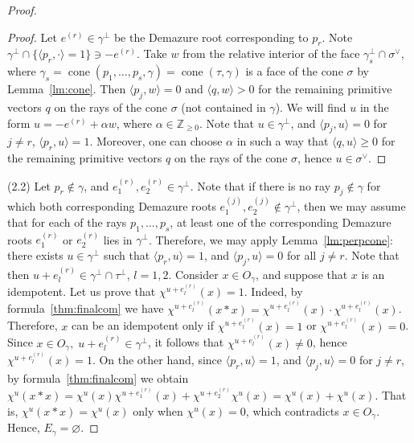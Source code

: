 \documentclass[10pt,a4paper]{amsart}
\DeclareMathOperator{\cone}{cone}
\newcommand{\ZZ}{\mathbb{Z}}
\begin{document}
\begin{proof}
\begin{proof}
Let $e^{(r)} \in \gamma^\perp$ be the Demazure root corresponding to $p_r$. Note $\gamma^\perp \cap \{ \langle p_r, \cdot \rangle = 1\} \ni -e^{(r)}$. Take $w$ from the relative interior of the face $\gamma_s^\perp \cap \sigma^\vee$, where $\gamma_s = \cone(p_1, \ldots, p_s, \gamma) = \cone(\tau, \gamma)$ is a face of the cone $\sigma$ by Lemma~\ref{lm:cone}. Then $\langle p_j, w \rangle = 0$ and $\langle q, w \rangle > 0$ for the remaining primitive vectors $q$ on the rays of the cone $\sigma$ (not contained in $\gamma$). We will find $u$ in the form $u = -e^{(r)} + \alpha w$, where $\alpha \in \ZZ_{\geq 0}$. Note that $u \in \gamma^\perp$, and $\langle p_j, u \rangle = 0$ for $j \neq r$, $\langle p_r, u \rangle = 1$. Moreover, one can choose $\alpha$ in such a way that $\langle q, u \rangle \geq 0$ for the remaining primitive vectors $q$ on the rays of the cone $\sigma$, hence $u \in \sigma^\vee$.
\end{proof}

(2.2) Let $p_r \notin \gamma$, and $e_1^{(r)}, e_2^{(r)} \in \gamma^\perp$. Note that if there is no ray $p_j \notin \gamma$ for which both corresponding Demazure roots $e_1^{(j)}, e_2^{(j)} \notin \gamma^\perp$, then we may assume that for each of the rays $p_1, \ldots, p_s$, at least one of the corresponding Demazure roots $e_1^{(r)}$ or $e_2^{(r)}$ lies in $\gamma^\perp$. Therefore, we may apply Lemma~\ref{lm:perpcone}: there exists $u \in \gamma^\perp$ such that $\langle p_r, u \rangle = 1$, and $\langle p_j, u \rangle = 0$ for all $j \neq r$. Note that then $u + e_l^{(r)} \in \gamma^\perp \cap \tau^\perp$, $l = 1, 2$. Consider $x \in O_\gamma$, and suppose that $x$ is an idempotent. Let us prove that $\chi^{u + e_l^{(r)}}(x) = 1$. Indeed, by formula~\eqref{thm:finalcom} we have $\chi^{u + e_l^{(r)}}(x*x) = \chi^{u + e_l^{(r)}}(x)\cdot\chi^{u + e_l^{(r)}}(x)$. Therefore, $x$ can be an idempotent only if ${\chi^{u + e_l^{(r)}}(x) = 1}$ or $\chi^{u + e_l^{(r)}}(x) = 0$. Since $x \in O_\gamma,\; u + e_l^{(r)} \in \gamma^\perp$, it follows that $\chi^{u + e_l^{(r)}}(x) \neq 0$, hence ${\chi^{u + e_l^{(r)}}(x) = 1}$. On the other hand, since $\langle p_r, u \rangle = 1$, and $\langle p_j, u \rangle = 0$ for $j \neq r$, by formula~\eqref{thm:finalcom} we obtain $\chi^u(x*x) = \chi^u(x)\chi^{u + e_1^{(r)}}(x) + \chi^{u + e_2^{(r)}}\chi^u(x) = \chi^u(x) + \chi^u(x)$. That is, $\chi^u(x*x) = \chi^u(x)$ only when $\chi^u(x) = 0$, which contradicts $x \in O_\gamma$. Hence, $E_\gamma = \varnothing$.


\end{proof}
\end{document}
